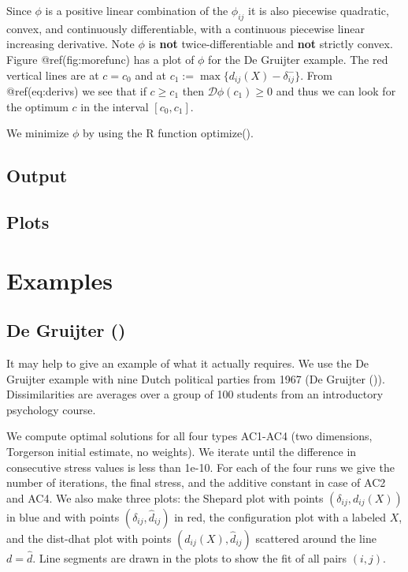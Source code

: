 \documentclass[
  12pt,
  letterpaper,
  DIV=11,
  numbers=noendperiod]{scrartcl}
\begin{document}
Since \(\phi\) is a positive linear combination of the \(\phi_{ij}\) it
is also piecewise quadratic, convex, and continuously differentiable,
with a continuous piecewise linear increasing derivative. Note \(\phi\)
is \textbf{not} twice-differentiable and \textbf{not} strictly convex.
Figure @ref(fig:morefunc) has a plot of \(\phi\) for the De Gruijter
example. The red vertical lines are at \(c=c_0\) and at
\(c_1:=\max\{d_{ij}(X)-\delta_{ij}^-\}\). From @ref(eq:derivs) we see
that if \(c\geq c_1\) then \(\mathcal{D}\phi(c_1)\geq 0\) and thus we
can look for the optimum \(c\) in the interval \([c_0,c_1]\).

We minimize \(\phi\) by using the R function optimize().

\subsection{Output}\label{output}

\subsection{Plots}\label{plots}

\section{Examples}\label{examples}

\subsection{\texorpdfstring{De Gruijter
()}{De Gruijter (1967)}}\label{degruijter_67}

It may help to give an example of what it actually requires. We use the
De Gruijter example with nine Dutch political parties from 1967 (De
Gruijter ()). Dissimilarities are
averages over a group of 100 students from an introductory psychology
course.

We compute optimal solutions for all four types AC1-AC4 (two dimensions,
Torgerson initial estimate, no weights). We iterate until the difference
in consecutive stress values is less than 1e-10. For each of the four
runs we give the number of iterations, the final stress, and the
additive constant in case of AC2 and AC4. We also make three plots: the
Shepard plot with points \((\delta_{ij},d_{ij}(X))\) in blue and with
points \((\delta_{ij},\hat d_{ij})\) in red, the configuration plot with
a labeled \(X\), and the dist-dhat plot with points
\((d_{ij}(X),\hat d_{ij})\) scattered around the line \(d=\hat d\). Line
segments are drawn in the plots to show the fit of all pairs \((i,j)\).
\end{document}
